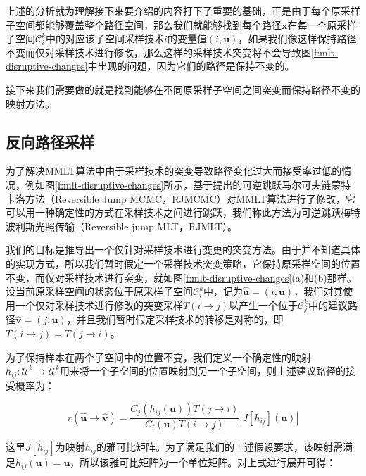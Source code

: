 上述的分析就为理解接下来要介绍的内容打下了重要的基础，正是由于每个原采样子空间都能够覆盖整个路径空间，那么我们就能够找到每个路径${\mathbf{x}}$在每一个原采样子空间$\mathscr{C}^{k}_i$中的对应该子空间采样技术$i$的变量值$(i,\mathbf{u})$，如果我们像这样保持路径不变而仅对采样技术进行修改，那么这样的采样技术突变将不会导致图\ref{f:mlt-disruptive-changes}中出现的问题，因为它们的路径是保持不变的。

接下来我们需要做的就是找到能够在不同原采样子空间之间突变而保持路径不变的映射方法。




\subsection{反向路径采样}
为了解决MMLT算法中由于采样技术的突变导致路径变化过大而接受率过低的情况，例如图\ref{f:mlt-disruptive-changes}所示，\cite{a:ReversibleJumpMetropolisLightTransportusingInverseMappings}基于\cite{a:ReversiblejumpMarkovchainMonteCarlocomputationandBayesianmodeldetermination}提出的可逆跳跃马尔可夫链蒙特卡洛方法（Reversible Jump MCMC，RJMCMC）对MMLT算法进行了修改，它可以用一种确定性的方式在采样技术之间进行跳跃，我们称此方法为可逆跳跃梅特波利斯光照传输（Reversible jump MLT，RJMLT）。

我们的目标是推导出一个仅针对采样技术进行变更的突变方法。由于并不知道具体的实现方式，所以我们暂时假定一个采样技术突变策略，它保持原采样空间的位置不变，而仅对采样技术进行突变，就如图\ref{f:mlt-disruptive-changes}(a)和(b)那样。设当前原采样空间的状态位于原采样子空间$\mathscr{C}^{k}_i$中，记为$\hat{\mathbf{u}}=(i,{\mathbf{u}})$，我们对其使用一个仅对采样技术进行修改的突变采样$T(i\to j)$以产生一个位于$\mathscr{C}^{k}_j$中的建议路径$\hat{\mathbf{v}}=(j,{\mathbf{u}})$，并且我们暂时假定采样技术的转移是对称的，即$T(i\to j)=T(j\to i)$。

为了保持样本在两个子空间中的位置不变，我们定义一个确定性的映射$h_{ij}:\mathcal{U}^{k}\to\mathcal{U}^{k}$用来将一个子空间的位置映射到另一个子空间，则上述建议路径的接受概率为：

\begin{equation}
	r(\hat{\mathbf{u}}\to\hat{\mathbf{v}})=\frac{C_j(h_{ij}({\mathbf{u}}))T(j\to i)}{C_i({\mathbf{u}})T(i\to j)}|J[h_{ij}]({\mathbf{u}})|
\end{equation}

\noindent 这里$J[h_{ij}]$为映射$h_{ij}$的雅可比矩阵。为了满足我们的上述假设要求，该映射需满足$h_{ij}({\mathbf{u}})={\mathbf{u}}$，所以该雅可比矩阵为一个单位矩阵。对上式进行展开可得：

